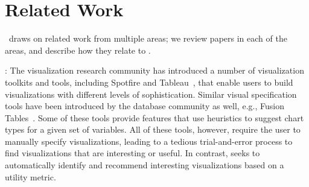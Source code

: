 

\section{Related Work}
\label{sec:related_work}
\SeeDB\ draws on related work from multiple areas;
we review papers in each of the areas, and describe how they relate to
\SeeDB. 

:
The visualization research community has introduced a number of
visualization toolkits and tools, including Spotfire and 
Tableau~\cite{polaris, Ahlberg:1996:SIE:245882.245893}, that enable
users to build visualizations with different levels of sophistication.
Similar visual specification tools have been introduced by the
database community as well, e.g., Fusion
Tables~\cite{DBLP:conf/sigmod/GonzalezHJLMSSG10}.
Some of these tools provide features that use heuristics to suggest
chart types for a given set of variables. 
All of these tools, however, require the user to manually specify
visualizations, leading to a tedious trial-and-error process to find
visualizations that are interesting or useful.
In contrast, \SeeDB seeks to automatically identify and 
recommend interesting visualizations based on a utility metric.




